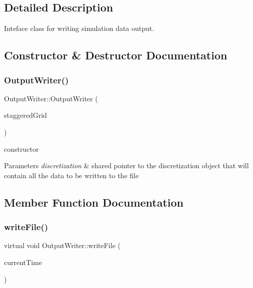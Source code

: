 \subsection{Detailed Description}
Inteface class for writing simulation data output. 

\subsection{Constructor \& Destructor Documentation}
\mbox{\label{classOutputWriter_ab4b0b2f2bfe8157c8436b20e9d860fe8}} 
\subsubsection{\texorpdfstring{OutputWriter()}{OutputWriter()}}
{\footnotesize\ttfamily Output\+Writer\+::\+Output\+Writer (\begin{DoxyParamCaption}\item[{std\+::shared\+\_\+ptr$<$ \mbox{\hyperlink{classStaggeredGrid}{Staggered\+Grid}} $>$}]{staggered\+Grid }\end{DoxyParamCaption})}

constructor 
\begin{DoxyParams}{Parameters}
{\em discretization} & shared pointer to the discretization object that will contain all the data to be written to the file \\
\hline
\end{DoxyParams}


\subsection{Member Function Documentation}
\mbox{\label{classOutputWriter_ac625c204affdc05919388a3549c2e945}} 
\subsubsection{\texorpdfstring{writeFile()}{writeFile()}}
{\footnotesize\ttfamily virtual void Output\+Writer\+::write\+File (\begin{DoxyParamCaption}\item[{double}]{current\+Time }\end{DoxyParamCaption})\hspace{0.3cm}{\ttfamily [pure virtual]}}



